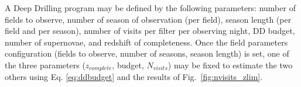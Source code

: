 \documentclass[\docopts]{\docclass}
\newcommand{\zcomp}{\mbox{$z_{complete}$}}
\newcommand{\nvisits}{$N_{visits}$}
\begin{document}
A Deep Drilling program may be defined by the following parameters: number of fields to observe, number of season of observation (per field), season length (per field and per season),  number of visits per filter per observing night, DD budget, number of supernovae, and redshift of completeness.  Once the field parameters configuration (fields to observe, number of seasons, season length) is set, one of the three parameters (\zcomp, budget, \nvisits) may be fixed to estimate the two others using Eq. \ref{eq:ddbudget} and the results of Fig.~\ref{fig:nvisits_zlim}. 

\end{document}
